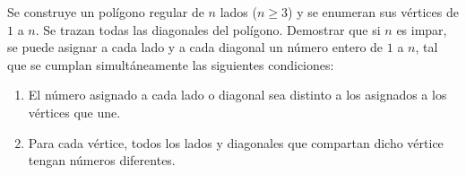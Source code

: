 Se construye un polígono regular de $n$ lados ($n \geq 3$) y se enumeran sus vértices de $1$ a $n$. Se trazan todas las diagonales del polígono. Demostrar que si $n$ es impar, se puede asignar a cada lado y a cada diagonal un número entero de $1$ a $n$, tal que se cumplan simultáneamente las siguientes condiciones:
 \begin{enumerate} 
   \item  El número asignado a cada lado o diagonal sea distinto a los asignados a los vértices que une.
   \item  Para cada vértice, todos los lados y diagonales que compartan dicho vértice tengan números diferentes.
 \end{enumerate} 
